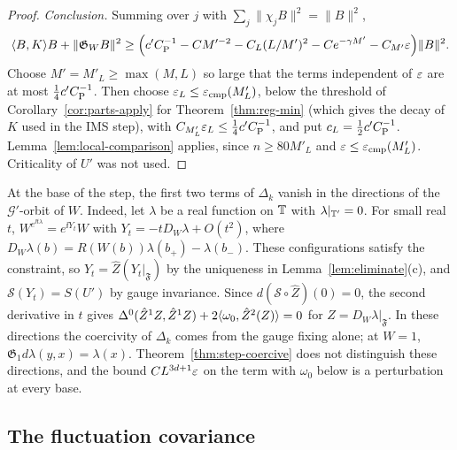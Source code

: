 \begin{proof}
\emph{Conclusion.} Summing over $j$ with $\sum_j\|\chi_jB\|^2=\|B\|^2$,
\[
\langle B,K\rangle B+\|\mathfrak G_WB\|^2\ge\Big(c'C_{\rm P}^{-1}-CM'^{-2}-C_L(L/M')^2-Ce^{-\gamma M'}-C_{M'}\varepsilon\Big)\|B\|^2 .
\]
Choose $M'=M'_L\ge\max(M,L)$ so large that the terms independent of $\varepsilon$ are at most $\frac14c'C_{\rm P}^{-1}$. Then choose $\varepsilon_L\le\varepsilon_{\rm cmp}(M'_L)$, below the threshold of Corollary~\ref{cor:parts-apply} for Theorem~\ref{thm:reg-min} (which gives the decay of $K$ used in the IMS step), with $C_{M'_L}\varepsilon_L\le\frac14c'C_{\rm P}^{-1}$, and put $c_L=\frac12c'C_{\rm P}^{-1}$. Lemma~\ref{lem:local-comparison} applies, since $n\ge80M'_L$ and $\varepsilon\le\varepsilon_{\rm cmp}(M'_L)$. Criticality of $U'$ was not used.
\end{proof}

\begin{remark}\label{x:34.5}
At the base of the step, the first two terms of $\Delta_k$ vanish in the directions of the $\mathcal G'$-orbit of $W$. Indeed, let $\lambda$ be a real function on $\mathbb T$ with $\lambda|_{\mathbb T'}=0$. For small real $t$, $W^{e^{\ii t\lambda}}=e^{\ii Y_t}W$ with $Y_t=-tD_W\lambda+O(t^2)$, where $D_W\lambda(b)=R(W(b))\lambda(b_+)-\lambda(b_-)$. These configurations satisfy the constraint, so $Y_t=\hat Z(Y_t|_{\mathfrak F})$ by the uniqueness in Lemma~\ref{lem:eliminate}(c), and $\mathcal S(Y_t)=S(U')$ by gauge invariance. Since $d(\mathcal S\circ\hat Z)(0)=0$, the second derivative in $t$ gives $\Delta^0(\hat Z^1Z,\hat Z^1Z)+2\langle \omega_0,\hat Z^2(Z)\rangle=0$ for $Z=D_W\lambda|_{\mathfrak F}$. In these directions the coercivity of $\Delta_k$ comes from the gauge fixing alone; at $W=1$, $\mathfrak G_1d\lambda(y,x)=\lambda(x)$. Theorem~\ref{thm:step-coercive} does not distinguish these directions, and the bound $CL^{3d+1}\varepsilon$ on the term with $\omega_0$ below is a perturbation at every base.
\end{remark}

\subsection{The fluctuation covariance}\label{ss:34.3}

